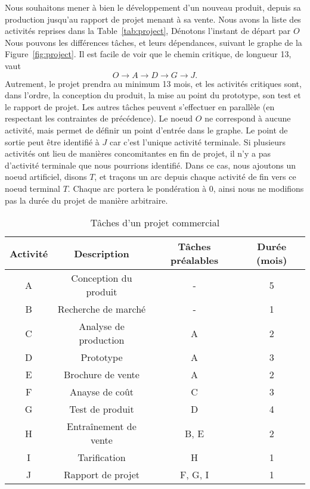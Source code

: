 \begin{example}
Nous souhaitons mener à bien le développement d'un nouveau produit, depuis sa production jusqu'au rapport de projet menant à sa vente.
Nous avons la liste des activités reprises dans la Table~\ref{tab:project},
Dénotons l'instant de départ par $O$
Nous pouvons les différences tâches, et leurs dépendances, suivant le graphe de la Figure~\ref{fig:project}.
Il est facile de voir que le chemin critique, de longueur 13, vaut
\[
O \rightarrow A  \rightarrow D  \rightarrow G  \rightarrow J.
\]
Autrement, le projet prendra au minimum 13 mois, et les activités critiques sont, dans l'ordre, la conception du produit, la mise au point du prototype, son test et le rapport de projet.
Les autres tâches peuvent s'effectuer en parallèle (en respectant les contraintes de précédence).
Le noeud $O$ ne correspond à aucune activité, mais permet de définir un point d'entrée dans le graphe.
Le point de sortie peut être identifié à $J$ car c'est l'unique activité terminale.
Si plusieurs activités ont lieu de manières concomitantes en fin de projet, il n'y a pas d'activité terminale que nous pourrions identifié.
Dans ce cas, nous ajoutons un noeud artificiel, disons $T$, et traçons un arc depuis chaque activité de fin vers ce noeud terminal $T$.
Chaque arc portera le pondération à 0, ainsi nous ne modifions pas la durée du projet de manière arbitraire.
\begin{table}[htb]
\begin{center}
\begin{tabular}{|c|c|c|c|}
\hline
Activité & Description & Tâches préalables & Durée (mois) \\
\hline
A & Conception du produit & - & 5 \\
\hline
B & Recherche de marché & - & 1 \\
\hline
C & Analyse de production & A & 2 \\
\hline
D & Prototype & A & 3 \\
\hline
E & Brochure de vente & A & 2 \\
\hline
F & Anayse de coût & C & 3 \\
\hline
G & Test de produit & D & 4 \\
\hline
H & Entraînement de vente & B, E & 2 \\
\hline
I & Tarification & H & 1 \\
\hline
J & Rapport de projet & F, G, I  & 1 \\
\hline
\end{tabular}
\caption{Tâches d'un projet commercial}

\end{center}
\end{table}
\end{example}
